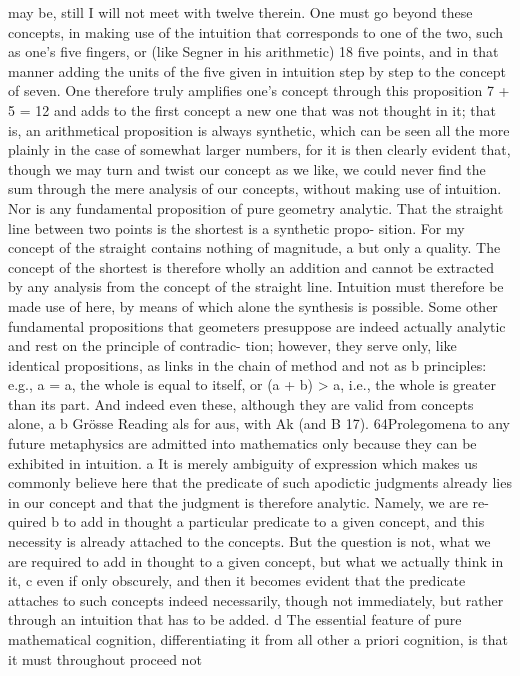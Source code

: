may be, still I will not meet with twelve therein. One must go beyond
these concepts, in making use of the intuition that corresponds to one of
the two, such as one’s ﬁve ﬁngers, or (like Segner in his arithmetic) 18 ﬁve
points, and in that manner adding the units of the ﬁve given in intuition
step by step to the concept of seven. One therefore truly ampliﬁes one’s
concept through this proposition 7 + 5 = 12 and adds to the ﬁrst concept
a new one that was not thought in it; that is, an arithmetical proposition
is always synthetic, which can be seen all the more plainly in the case
of somewhat larger numbers, for it is then clearly evident that, though
we may turn and twist our concept as we like, we could never ﬁnd the
sum through the mere analysis of our concepts, without making use of
intuition.
Nor is any fundamental proposition of pure geometry analytic. That
the straight line between two points is the shortest is a synthetic propo-
sition. For my concept of the straight contains nothing of magnitude, a
but only a quality. The concept of the shortest is therefore wholly an
addition and cannot be extracted by any analysis from the concept of the
straight line. Intuition must therefore be made use of here, by means of
which alone the synthesis is possible.
Some other fundamental propositions that geometers presuppose
are indeed actually analytic and rest on the principle of contradic-
tion; however, they serve only, like identical propositions, as links in
the chain of method and not as b principles: e.g., a = a, the whole is
equal to itself, or (a + b) > a, i.e., the whole is greater than its part.
And indeed even these, although they are valid from concepts alone,
a
b
Grösse
Reading als for aus, with Ak (and B 17).
64Prolegomena to any future metaphysics
are admitted into mathematics only because they can be exhibited in
intuition. a
It is merely ambiguity of expression which makes us commonly believe
here that the predicate of such apodictic judgments already lies in our
concept and that the judgment is therefore analytic. Namely, we are re-
quired b to add in thought a particular predicate to a given concept, and
this necessity is already attached to the concepts. But the question is not,
what we are required to add in thought to a given concept, but what we
actually think in it, c even if only obscurely, and then it becomes evident
that the predicate attaches to such concepts indeed necessarily, though
not immediately, but rather through an intuition that has to be added. d
The essential feature of pure mathematical cognition, differentiating
it from all other a priori cognition, is that it must throughout proceed not
